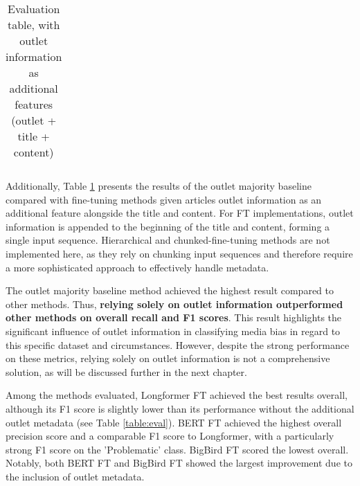\begin{table}[htbp]
\begin{tabular}{| c | c | c | c | c |}
    \end{tabular}
    \caption{Evaluation table, with outlet information as additional features (outlet + title + content)}
    \label{table:eval-outlet}
\end{table}

Additionally, Table \ref{table:eval-outlet} presents the results of the outlet majority baseline compared with fine-tuning methods given articles outlet information as an additional feature alongside the title and content. For FT implementations, outlet information is appended to the beginning of the title and content, forming a single input sequence. Hierarchical and chunked-fine-tuning methods are not implemented here, as they rely on chunking input sequences and therefore require a more sophisticated approach to effectively handle metadata.

The outlet majority baseline method achieved the highest result compared to other methods. Thus, \textbf{relying solely on outlet information outperformed other methods on overall recall and F1 scores}. This result highlights the significant influence of outlet information in classifying media bias in regard to this specific dataset and circumstances. However, despite the strong performance on these metrics, relying solely on outlet information is not a comprehensive solution, as will be discussed further in the next chapter.

Among the methods evaluated, Longformer FT achieved the best results overall, although its F1 score is slightly lower than its performance without the additional outlet metadata (see Table \ref{table:eval}). BERT FT achieved the highest overall precision score and a comparable F1 score to Longformer, with a particularly strong F1 score on the 'Problematic' class. BigBird FT scored the lowest overall. Notably, both BERT FT and BigBird FT showed the largest improvement due to the inclusion of outlet metadata.



